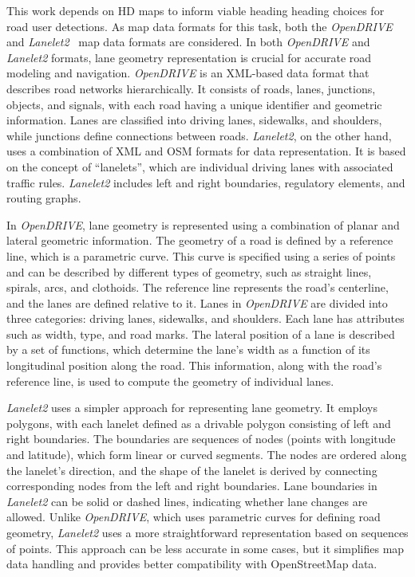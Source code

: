 This work depends on HD maps to inform viable heading heading choices for road user detections.
As map data formats for this task, both the \textit{OpenDRIVE}~\cite{dupuis2010opendrive, althoff2018automatic} and \textit{Lanelet2}~\cite{poggenhans2018lanelet2} map data formats are considered.
In both \textit{OpenDRIVE} and \textit{Lanelet2} formats, lane geometry representation is crucial for accurate road modeling and navigation.
\textit{OpenDRIVE} is an XML-based data format that describes road networks hierarchically.
It consists of roads, lanes, junctions, objects, and signals, with each road having a unique identifier and geometric information.
Lanes are classified into driving lanes, sidewalks, and shoulders, while junctions define connections between roads.
\textit{Lanelet2}, on the other hand, uses a combination of XML and OSM formats for data representation.
It is based on the concept of \enquote{lanelets}, which are individual driving lanes with associated traffic rules.
\textit{Lanelet2} includes left and right boundaries, regulatory elements, and routing graphs.

In \textit{OpenDRIVE}, lane geometry is represented using a combination of planar and lateral geometric information.
The geometry of a road is defined by a reference line, which is a parametric curve.
This curve is specified using a series of points and can be described by different types of geometry, such as straight lines, spirals, arcs, and clothoids.
The reference line represents the road's centerline, and the lanes are defined relative to it.
Lanes in \textit{OpenDRIVE} are divided into three categories: driving lanes, sidewalks, and shoulders.
Each lane has attributes such as width, type, and road marks.
The lateral position of a lane is described by a set of functions, which determine the lane's width as a function of its longitudinal position along the road.
This information, along with the road's reference line, is used to compute the geometry of individual lanes.

\textit{Lanelet2} uses a simpler approach for representing lane geometry.
It employs polygons, with each lanelet defined as a drivable polygon consisting of left and right boundaries.
The boundaries are sequences of nodes (points with longitude and latitude), which form linear or curved segments.
The nodes are ordered along the lanelet's direction, and the shape of the lanelet is derived by connecting corresponding nodes from the left and right boundaries.
Lane boundaries in \textit{Lanelet2} can be solid or dashed lines, indicating whether lane changes are allowed.
Unlike \textit{OpenDRIVE}, which uses parametric curves for defining road geometry, \textit{Lanelet2} uses a more straightforward representation based on sequences of points.
This approach can be less accurate in some cases, but it simplifies map data handling and provides better compatibility with OpenStreetMap data.

